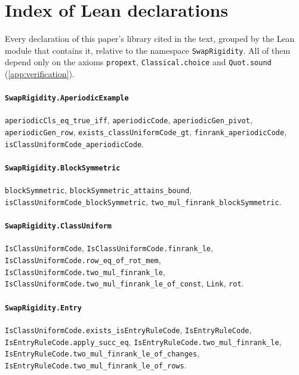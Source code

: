 \section{Index of Lean declarations}\label{app:leanindex}

Every declaration of this paper's library cited in the text, grouped by the Lean module that contains it, relative to the namespace
\texttt{SwapRigidity}. All of them depend only on the axioms \texttt{propext}, \texttt{Classical.choice} and
\texttt{Quot.sound} (\cref{app:verification}).

\paragraph{\texttt{SwapRigidity.AperiodicExample}}
{\small\raggedright \texttt{aperiodicCls\_eq\_true\_iff}, \texttt{aperiodicCode}, \texttt{aperiodicGen\_pivot}, \texttt{aperiodicGen\_row}, \texttt{exists\_classUniformCode\_gt}, \texttt{finrank\_aperiodicCode}, \texttt{isClassUniformCode\_aperiodicCode}.\par}

\paragraph{\texttt{SwapRigidity.BlockSymmetric}}
{\small\raggedright \texttt{blockSymmetric}, \texttt{blockSymmetric\_attains\_bound}, \texttt{isClassUniformCode\_blockSymmetric}, \texttt{two\_mul\_finrank\_blockSymmetric}.\par}

\paragraph{\texttt{SwapRigidity.ClassUniform}}
{\small\raggedright \texttt{IsClassUniformCode}, \texttt{IsClassUniformCode.finrank\_le}, \texttt{IsClassUniformCode.row\_eq\_of\_rot\_mem}, \texttt{IsClassUniformCode.two\_mul\_finrank\_le}, \texttt{IsClassUniformCode.two\_mul\_finrank\_le\_of\_const}, \texttt{Link}, \texttt{rot}.\par}

\paragraph{\texttt{SwapRigidity.Entry}}
{\small\raggedright \texttt{IsClassUniformCode.exists\_isEntryRuleCode}, \texttt{IsEntryRuleCode}, \texttt{IsEntryRuleCode.apply\_succ\_eq}, \texttt{IsEntryRuleCode.two\_mul\_finrank\_le}, \texttt{IsEntryRuleCode.two\_mul\_finrank\_le\_of\_changes}, \texttt{IsEntryRuleCode.two\_mul\_finrank\_le\_of\_rows}.\par}

